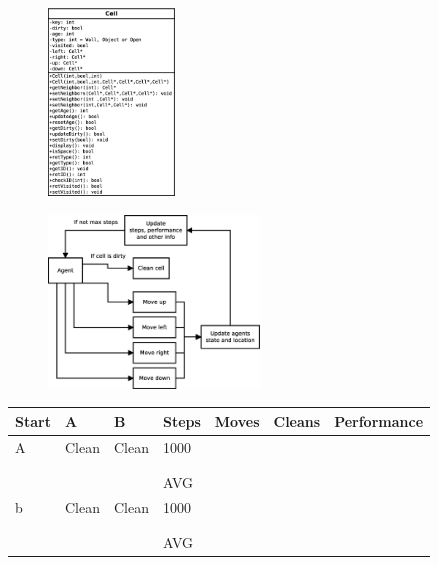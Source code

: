 \begin{figure}[h] \label{fig:}	\centering
\includegraphics[width=0.3\textwidth]{cell_uml}
\caption{}
\end{figure}

\begin{figure}[h] \label{fig:}	\centering
\includegraphics[width=0.5\textwidth]{agent}
\caption{}
\end{figure}

\begin{longtable}{p{} p{} p{} 
									p{} p{} p{} 
									p{}}
Start	& A & B & Steps & Moves & Cleans & Performance \\\hline
A & Clean & Clean & 1000 
		 &  &  &  \\
	&&&&  &  &  \\
	&&&&  &  &  \\\hline
  &&&  AVG &  &  &  \\\hline
b & Clean & Clean & 1000 
		 &  &  &  \\
	&&&&  &  &  \\
	&&&&  &  &  \\\hline
  &&&  AVG &  &  &  \\\hline
\end{longtable}


